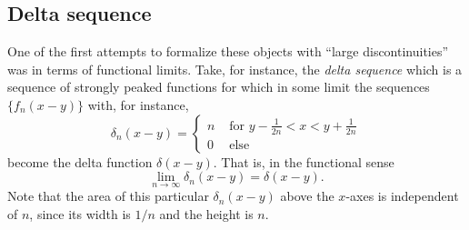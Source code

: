 \subsection{Delta sequence}
One of the first attempts to formalize these objects with ``large discontinuities''
was in terms
of functional limits.
Take, for instance, the {\em delta sequence}
which is a sequence of strongly peaked functions for which
in some limit
the sequences $\{f_n(x-y)\}$ with, for instance,
\begin{equation}
\delta_n(x-y) =
\left\{
\begin{array}{rl}
n & \textrm{ for } y - \frac{1}{2n}  < x < y+ \frac{1}{2n} \\
0& \textrm{ else }
\end{array}
\right.
\label{2011-m-deltseq}
\end{equation}
 become the delta function $\delta (x-y)$.
That is,
in the functional sense
\begin{equation}
\lim_{n\rightarrow \infty} \delta_n(x-y)= \delta (x-y) .
\end{equation}
Note that the area of this particular $\delta_n(x-y)$ above the $x$-axes
is independent of $n$, since its width is $1/n$ and the height is $n$.



